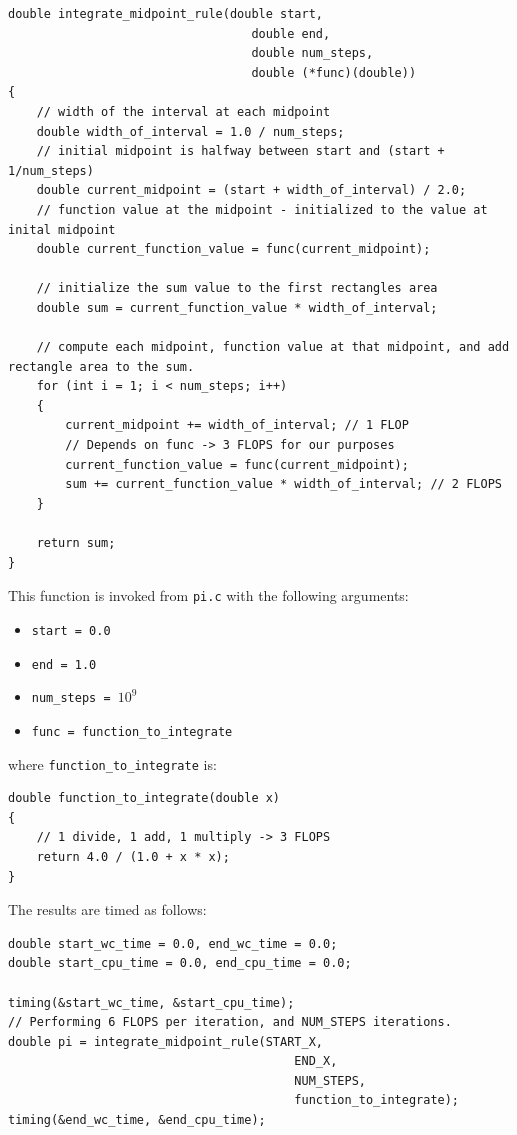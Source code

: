 \documentclass{article}
\begin{document}
\begin{lstlisting}
double integrate_midpoint_rule(double start,
                                  double end,
                                  double num_steps,
                                  double (*func)(double))
{
    // width of the interval at each midpoint
    double width_of_interval = 1.0 / num_steps; 
    // initial midpoint is halfway between start and (start + 1/num_steps)
    double current_midpoint = (start + width_of_interval) / 2.0;
    // function value at the midpoint - initialized to the value at inital midpoint
    double current_function_value = func(current_midpoint);

    // initialize the sum value to the first rectangles area
    double sum = current_function_value * width_of_interval;

    // compute each midpoint, function value at that midpoint, and add rectangle area to the sum.
    for (int i = 1; i < num_steps; i++)
    {
        current_midpoint += width_of_interval; // 1 FLOP
        // Depends on func -> 3 FLOPS for our purposes
        current_function_value = func(current_midpoint);
        sum += current_function_value * width_of_interval; // 2 FLOPS
    }

    return sum;
}
\end{lstlisting}
This function is invoked from \texttt{pi.c} with the following arguments:
\begin{itemize}
    \item \texttt{start = 0.0}
    \item \texttt{end = 1.0}
    \item \texttt{num\_steps = $10^9$}
    \item \texttt{func = function\_to\_integrate}
\end{itemize}
where \texttt{function\_to\_integrate} is: 
\newpage
\begin{lstlisting}
double function_to_integrate(double x)
{
    // 1 divide, 1 add, 1 multiply -> 3 FLOPS
    return 4.0 / (1.0 + x * x);
}
\end{lstlisting}
The results are timed as follows:
\begin{lstlisting}
double start_wc_time = 0.0, end_wc_time = 0.0;
double start_cpu_time = 0.0, end_cpu_time = 0.0;

timing(&start_wc_time, &start_cpu_time);
// Performing 6 FLOPS per iteration, and NUM_STEPS iterations.
double pi = integrate_midpoint_rule(START_X,
                                        END_X,
                                        NUM_STEPS,
                                        function_to_integrate);
timing(&end_wc_time, &end_cpu_time);
\end{lstlisting}
\end{document}
